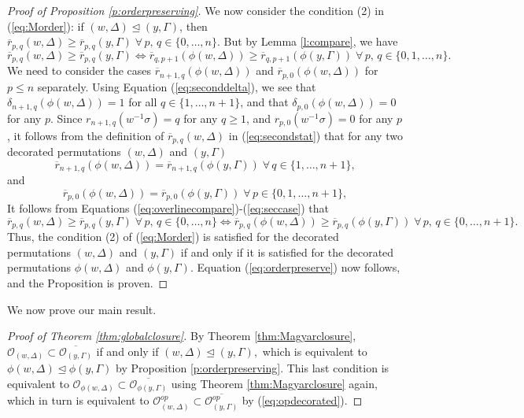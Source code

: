 \documentclass[12pt]{amsart}
\numberwithin{equation}{section}
\begin{document}
\begin{proof}[Proof of Proposition \ref{p:orderpreserving}]
 We now consider the condition (2) in (\ref{eq:Morder}): if $(w,\Delta)\unlhd (y,\Gamma)$, then $\overline{r}_{p,q}(w,\Delta)\geq \overline{r}_{p,q}(y,\Gamma)\; \forall\, p,\,q\in\{0,\dots, n\}.$  But by Lemma \ref{l:compare}, we have 
\begin{equation}\label{eq:overlinecompare}
\overline{r}_{p,q}(w,\Delta)\geq \overline{r}_{p,q}(y,\Gamma)\Leftrightarrow \overline{r}_{q,p+1}(\phi(w,\Delta))\geq \overline{r}_{q,p+1}(\phi(y,\Gamma))\; \forall \, p,\,q \in\{0, 1,\dots, n\}. 
\end{equation}
We need to consider the cases $\overline{r}_{n+1, q}(\phi(w,\Delta))$ and 
$\overline{r}_{p,0}(\phi(w,\Delta))$ for $p \le n$ separately.  Using Equation (\ref{eq:seconddelta}), we 
see that $\delta_{n+1,q}(\phi(w,\Delta))=1$ for all $q\in\{1,\dots, n+1\}$, and that 
$\delta_{p,0}(\phi(w,\Delta))=0$ for any $p$.     Since $r_{n+1,q}(w^{-1}\sigma)=q$ for any $q\geq 1$, and $r_{p,0}(w^{-1}\sigma)=0$ for any $p$, it follows from the definition of 
$\overline{r}_{p,q}(w,\Delta)$ in (\ref{eq:secondstat}) that for any two decorated permutations $(w,\Delta)$ and $(y,\Gamma)$ 
\begin{equation}\label{eq:extremecase}
\overline{r}_{n+1,q}(\phi(w,\Delta))=\overline{r}_{n+1, q}(\phi(y,\Gamma))\;\forall\, q\in \{1,\dots, n+1\},
\end{equation}
and 
\begin{equation}\label{eq:seccase}
\overline{r}_{p,0}(\phi(w,\Delta))=\overline{r}_{p, 0}(\phi(y,\Gamma))\;\forall\, p\in \{0,1,\dots, n+1\},
\end{equation}
It follows from Equations (\ref{eq:overlinecompare})-(\ref{eq:seccase}) that 
$$
\overline{r}_{p,q}(w,\Delta)\geq \overline{r}_{p,q}(y,\Gamma)\; \forall\, p,\,q \in\{0,\dots, n\}\Leftrightarrow \overline{r}_{p,q}(\phi(w,\Delta))\geq \overline{r}_{p,q}(\phi(y,\Gamma))\; \forall\, p,\,q \in\{0,\dots, n+1\}.
$$
Thus, the condition (2) of (\ref{eq:Morder}) is satisfied for the decorated permutations 
$(w,\Delta)$ and $(y,\Gamma)$ if and only if it is satisfied for the decorated permutations
$\phi(w,\Delta)$ and $\phi(y,\Gamma)$.  Equation (\ref{eq:orderpreserve}) now follows, and the Proposition is proven.
\end{proof}

We now prove our main result.

\begin{proof}[Proof of Theorem \ref{thm:globalclosure}]
By Theorem \ref{thm:Magyarclosure}, $\mathcal{O}_{(w,\Delta)}\subset\overline{\mathcal{O}_{(y,\Gamma)}}$ if and only if $(w,\Delta)\unlhd (y,\Gamma),$ which is equivalent to $\phi(w,\Delta)\unlhd \phi(y,\Gamma)$ by Proposition \ref{p:orderpreserving}.  This last condition is equivalent to $\mathcal{O}_{\phi(w,\Delta)} \subset \overline{\mathcal{O}_{\phi(y,\Gamma)}}$ using Theorem \ref{thm:Magyarclosure} again, which in turn is equivalent to $\mathcal{O}_{(w,\Delta)}^{op}\subset\overline{\mathcal{O}_{(y,\Gamma)}^{op}}$ by (\ref{eq:opdecorated}).
\end{proof}
\end{document}
